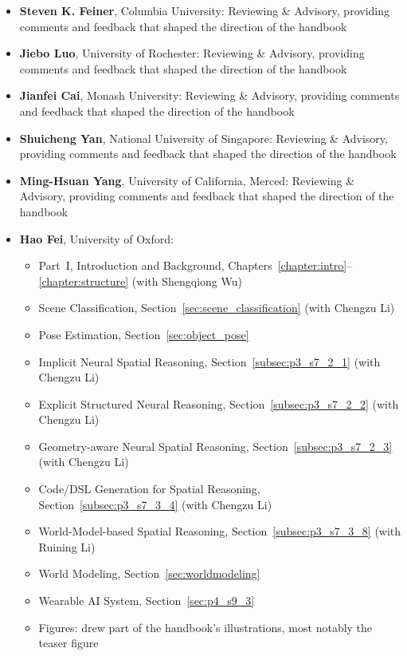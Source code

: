 \begin{itemize}[leftmargin=*]
    \item \textbf{Steven K. Feiner}, Columbia University: Reviewing \& Advisory, providing comments and feedback that shaped the direction of the handbook
    \item \textbf{Jiebo Luo}, University of Rochester: Reviewing \& Advisory, providing comments and feedback that shaped the direction of the handbook
    \item \textbf{Jianfei Cai}, Monash University: Reviewing \& Advisory, providing comments and feedback that shaped the direction of the handbook
    \item \textbf{Shuicheng Yan}, National University of Singapore: Reviewing \& Advisory, providing comments and feedback that shaped the direction of the handbook
    \item \textbf{Ming-Hsuan Yang}, University of California, Merced: Reviewing \& Advisory, providing comments and feedback that shaped the direction of the handbook
    \item \textbf{Hao Fei}, University of Oxford:
        \begin{itemize}
            \item Part~I, Introduction and Background, Chapters~\ref{chapter:intro}--\ref{chapter:structure} (with Shengqiong Wu)
            \item Scene Classification, Section~\ref{sec:scene_classification} (with Chengzu Li)
            \item Pose Estimation, Section~\ref{sec:object_pose}
            \item Implicit Neural Spatial Reasoning, Section~\ref{subsec:p3_s7_2_1} (with Chengzu Li)
            \item Explicit Structured Neural Reasoning, Section~\ref{subsec:p3_s7_2_2} (with Chengzu Li)
            \item Geometry-aware Neural Spatial Reasoning, Section~\ref{subsec:p3_s7_2_3} (with Chengzu Li)
            \item Code/DSL Generation for Spatial Reasoning, Section~\ref{subsec:p3_s7_3_4} (with Chengzu Li)
            \item World-Model-based Spatial Reasoning, Section~\ref{subsec:p3_s7_3_8} (with Ruining Li)
            \item World Modeling, Section~\ref{sec:worldmodeling}
            \item Wearable AI System, Section~\ref{sec:p4_s9_3}
            \item Figures: drew part of the handbook's illustrations, most notably the teaser figure
        \end{itemize}
\end{itemize}
